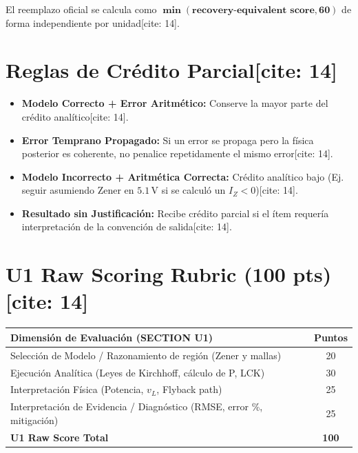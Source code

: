 \documentclass[11pt, a4paper]{article}
\begin{document}
\begin{tcolorbox}[colback=ucbblue!5, colframe=ucbblue, title=\textbf{Rúbrica de Corrección Independiente — Recuperatorio EC1 y EC2}]
    El reemplazo oficial se calcula como $\mathbf{\min(\text{recovery-equivalent score}, 60)}$ de forma independiente por unidad[cite: 14].
\end{tcolorbox}

\section*{Reglas de Crédito Parcial[cite: 14]}
\begin{itemize}
    \setlength\itemsep{0.2em}
    \item \textbf{Modelo Correcto + Error Aritmético:} Conserve la mayor parte del crédito analítico[cite: 14].
    \item \textbf{Error Temprano Propagado:} Si un error se propaga pero la física posterior es coherente, no penalice repetidamente el mismo error[cite: 14].
    \item \textbf{Modelo Incorrecto + Aritmética Correcta:} Crédito analítico bajo (Ej. seguir asumiendo Zener en $5.1\,\text{V}$ si se calculó un $I_Z < 0$)[cite: 14].
    \item \textbf{Resultado sin Justificación:} Recibe crédito parcial si el ítem requería interpretación de la convención de salida[cite: 14].
\end{itemize}

\section*{U1 Raw Scoring Rubric (100 pts)[cite: 14]}
\renewcommand{\arraystretch}{1.4}
\begin{tabularx}{\textwidth}{|>{\raggedright\arraybackslash}X|c|}
\hline
\rowcolor{ucbblue!20}
\textbf{Dimensión de Evaluación (SECTION U1)} & \textbf{Puntos} \\ \hline
Selección de Modelo / Razonamiento de región (Zener y mallas) & 20 \\ \hline
Ejecución Analítica (Leyes de Kirchhoff, cálculo de P, LCK) & 30 \\ \hline
Interpretación Física (Potencia, $v_L$, Flyback path) & 25 \\ \hline
Interpretación de Evidencia / Diagnóstico (RMSE, error \%, mitigación) & 25 \\ \hline
\rowcolor{gray!10}
\textbf{U1 Raw Score Total} & \textbf{100} \\ \hline
\end{tabularx}
\end{document}
